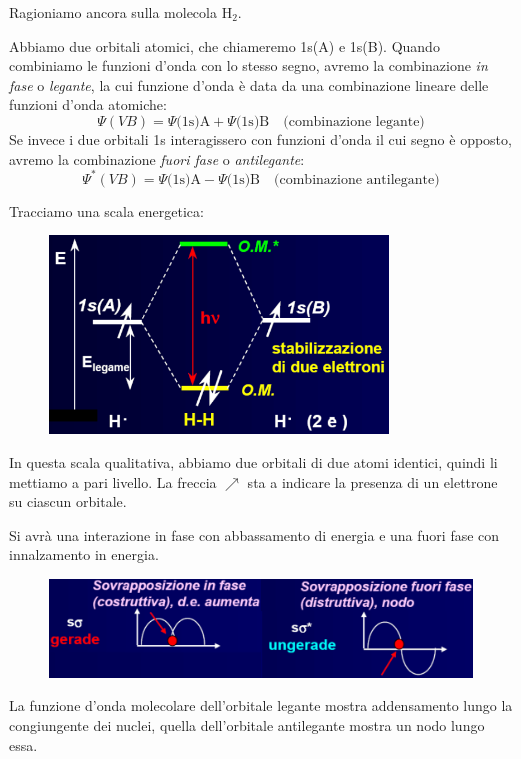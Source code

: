 Ragioniamo ancora sulla molecola H$_2$.

Abbiamo due orbitali atomici, che chiameremo 1s(A) e 1s(B). Quando combiniamo le funzioni d'onda con lo stesso segno, avremo la combinazione \textit{in fase} o \textit{legante}, la cui funzione d'onda è data da una combinazione lineare delle funzioni d'onda atomiche:
$$\Psi(VB)=\Psi\text{(1s)A} + \Psi\text{(1s)B} \quad \text{(combinazione legante)}$$
Se invece i due orbitali 1s interagissero con funzioni d'onda il cui segno è opposto, avremo la combinazione \textit{fuori fase} o \textit{antilegante}:
$$\Psi^*(VB)=\Psi\text{(1s)A} - \Psi\text{(1s)B} \quad \text{(combinazione antilegante)}$$

Tracciamo una scala energetica:

\begin{figure}[htp]
    \centering
    \includegraphics[width=9cm]{immagini/scala_energia_H_2.png}
\end{figure}

In questa scala qualitativa, abbiamo due orbitali di due atomi identici, quindi li mettiamo a pari livello. La freccia $\nearrow$ sta a indicare la presenza di un elettrone su ciascun orbitale.

Si avrà una interazione in fase con abbassamento di energia e una fuori fase con innalzamento in energia.

\begin{figure}[htp]
    \centering
    \includegraphics[width=12cm]{immagini/sovrapposizione_in_fase_e_fuori_fase.png}
\end{figure}

La funzione d'onda molecolare dell'orbitale legante mostra addensamento lungo la congiungente dei nuclei, quella dell'orbitale antilegante mostra un nodo lungo essa.

